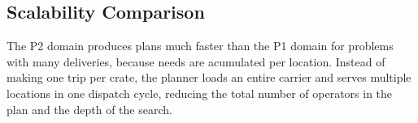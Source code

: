 \documentclass{article}
\begin{document}
\subsection{Scalability Comparison}

The P2 domain produces plans much faster than the P1 domain for problems with many deliveries, because needs are acumulated per location. Instead of making one trip per crate, the planner loads an entire carrier and serves multiple locations in one dispatch cycle, reducing the total number of operators in the plan and the depth of the search.
\end{document}
